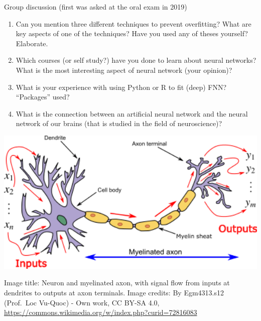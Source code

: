 \documentclass[
  ignorenonframetext,
]{beamer}
\begin{document}
\begin{frame}
\begin{block}{Group discussion}
\protect\hypertarget{group-discussion-1}{}
(first was asked at the oral exam in 2019)

\begin{enumerate}
[1)]
\item
  Can you mention three different techniques to prevent overfitting?
  What are key aspects of one of the techniques? Have you used any of
  theses yourself? Elaborate.
\item
  Which courses (or self study?) have you done to learn about neural
  networks? What is the most interesting aspect of neural network (your
  opinion)?
\item
  What is your experience with using Python or R to fit (deep) FNN?
  ``Packages'' used?
\item
  What is the connection between an artificial neural network and the
  neural network of our brains (that is studied in the field of
  neuroscience)?
\end{enumerate}

\includegraphics[width=500pt]{./Neuron3}

Image title: Neuron and myelinated axon, with signal flow from inputs at
dendrites to outputs at axon terminals. Image credits: By Egm4313.s12
(Prof.~Loc Vu-Quoc) - Own work, CC BY-SA 4.0,
\url{https://commons.wikimedia.org/w/index.php?curid=72816083}
\end{block}
\end{frame}
\end{document}
